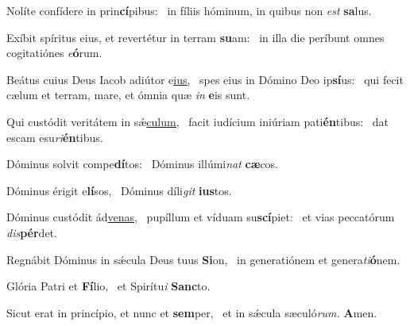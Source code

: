 \begin{psalmus}
Nolíte confídere in prin\textbf{cí}\-pibus:~\grestar{} 
in fíliis hóminum, in quibus non\emph{ est }\textbf{sa}\-lus.~\Rbardot{}

Exíbit spíritus eius, et revertétur in ter\-ram \textbf{su}\-am:~\grestar{} 
in illa die períbunt omnes cogitatió\-nes \emph{e}\textbf{ó}\-rum.~\Rbardot{}

Beátus cuius Deus Iacob adiútor e\underline{\-ius,}~\dag\mbox{} 
spes eius in Dómino De\-o ip\textbf{sí}\-us:~\grestar{} 
qui fecit cælum et terram, mare, et ómnia quæ\emph{ in }\textbf{e}\-is sunt.

Qui custódit veritátem in sǽ\underline{\-culum,}~\dag\mbox{} 
facit iudícium iniúriam pa\-ti\textbf{én}\-tibus:~\grestar{} 
dat escam esu\emph{\-ri}\textbf{én}\-tibus.~\Rbardot{}

Dóminus solvit com\-pe\textbf{dí}\-tos:~\grestar{} 
Dóminus illú\-mi\emph{nat }\textbf{cæ}\-cos.

Dóminus érigit e\textbf{lí}\-sos,~\grestar{} 
Dóminus dí\-li\emph{git }\textbf{ius}\-tos.~\Rbardot{}

Dóminus custódit ád\underline{\-venas,}~\dag\mbox{} 
pupíllum et víduam su\textbf{scí}\-piet:~\grestar{} 
et vias peccató\-rum \emph{dis}\textbf{pér}\-det.

Regnábit Dóminus in sǽcula Deus tu\-us \textbf{Si}\-on,~\grestar{} 
in generatiónem et genera\emph{\-ti}\textbf{ó}\-nem.~\Rbardot{}

Glória Pa\-tri et \textbf{Fí}\-lio,~\grestar{} 
et Spirí\-tu\emph{i }\textbf{Sanc}\-to.

Sicut erat in princípio, et nunc et \textbf{sem}\-per,~\grestar{} 
et in sǽcula sæculó\emph{\-rum. }\textbf{A}\-men.
\end{psalmus}
